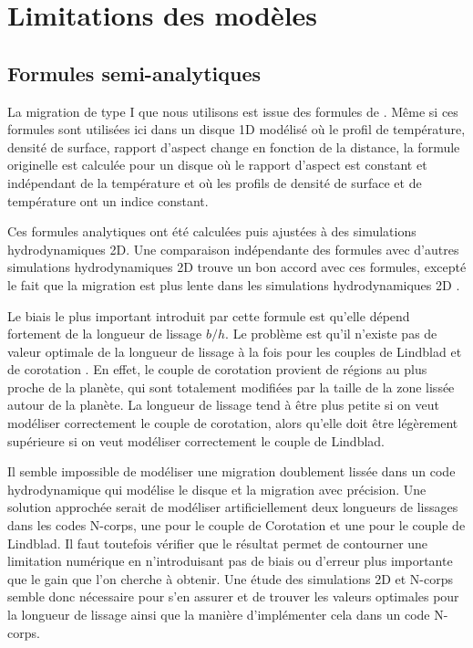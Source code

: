 \section{Limitations des modèles}
\subsection{Formules semi-analytiques}
La migration de type I que nous utilisons est issue des formules de \cite{paardekooper2011torque}. Même si ces formules sont utilisées ici dans un disque 1D modélisé où le profil de température, densité de surface, rapport d'aspect change en fonction de la distance, la formule originelle est calculée pour un disque où le rapport d'aspect est constant et indépendant de la température et où les profils de densité de surface et de température ont un indice constant. 

Ces formules analytiques ont été calculées puis ajustées à des simulations hydrodynamiques 2D. Une comparaison indépendante des formules avec d'autres simulations hydrodynamiques 2D trouve un bon accord avec ces formules, excepté le fait que la migration est plus lente dans les simulations hydrodynamiques 2D \citep{pierens2013makingaccepted}. 

Le biais le plus important introduit par cette formule est qu'elle dépend fortement de la longueur de lissage $b/h$. Le problème est qu'il n'existe pas de valeur optimale de la longueur de lissage à la fois pour les couples de Lindblad et de corotation \citep{masset2002coorbital}. En effet, le couple de corotation provient de régions au plus proche de la planète, qui sont totalement modifiées par la taille de la zone lissée autour de la planète. La longueur de lissage tend à être plus petite si on veut modéliser correctement le couple de corotation, alors qu'elle doit être légèrement supérieure si on veut modéliser correctement le couple de Lindblad. 

Il semble impossible de modéliser une migration doublement lissée dans un code hydrodynamique qui modélise le disque et la migration avec précision. Une solution approchée serait de modéliser artificiellement deux longueurs de lissages dans les codes N-corps, une pour le couple de Corotation et une pour le couple de Lindblad. Il faut toutefois vérifier que le résultat permet de contourner une limitation numérique en n'introduisant pas de biais ou d'erreur plus importante que le gain que l'on cherche à obtenir. Une étude des simulations 2D et N-corps semble donc nécessaire pour s'en assurer et de trouver les valeurs optimales pour la longueur de lissage ainsi que la manière d'implémenter cela dans un code N-corps. 

